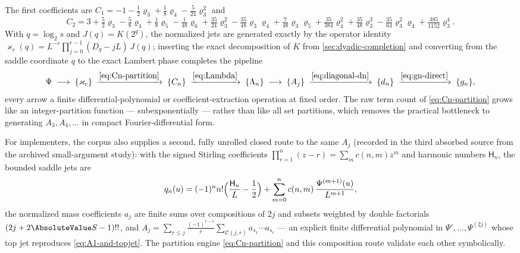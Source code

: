 \documentclass[11pt,oneside]{article}
\numberwithin{equation}{section}
\theoremstyle{definition}
\theoremstyle{remark}
\newcommand{\Hnum}{\mathsf H}
\begin{document}
The first coefficients are
$C_1=-1-\tfrac12\varrho_3+\tfrac18\varrho_4
-\tfrac5{24}\varrho_3^{2}$ and
\begin{equation}
 C_2=3+\tfrac52\varrho_3-\tfrac58\varrho_4+\tfrac18\varrho_5
 -\tfrac1{48}\varrho_6
 +\tfrac{35}{24}\varrho_3^{2}-\tfrac{35}{48}\varrho_3\varrho_4
 +\tfrac7{48}\varrho_3\varrho_5+\tfrac{35}{384}\varrho_4^{2}
 +\tfrac{35}{48}\varrho_3^{3}
 -\tfrac{35}{64}\varrho_3^{2}\varrho_4
 +\tfrac{385}{1152}\varrho_3^{4}.
 \label{eq:C2}
\end{equation}
With $q=\log_2s$ and $J(q)=K(2^{q})$, the normalized jets are
generated exactly by the operator identity
$\varkappa_r(q)=L^{-r}\prod_{j=0}^{r-1}(D_q-jL)\,J(q)$; inserting
the exact decomposition of $K$ from
\cref{sec:dyadic-completion} and converting from the saddle
coordinate $q$ to the exact Lambert phase completes the pipeline
\begin{equation}
 \Psi
 \;\longrightarrow\;\{\varkappa_r\}
 \;\xrightarrow{\eqref{eq:Cn-partition}}\;\{C_n\}
 \;\xrightarrow{\eqref{eq:Lambda}}\;\{\Lambda_n\}
 \;\longrightarrow\;\{A_j\}
 \;\xrightarrow{\eqref{eq:diagonal-dn}}\;\{d_n\}
 \;\xrightarrow{\eqref{eq:gn-direct}}\;\{g_n\},
 \label{eq:pipeline}
\end{equation}
every arrow a finite differential-polynomial or
coefficient-extraction operation at fixed order.  The raw term count
of \eqref{eq:Cn-partition} grows like an integer-partition function
--- subexponentially --- rather than like all set partitions, which
removes the practical bottleneck to generating $A_3,A_4,\dots$ in
compact Fourier-differential form.

For implementers, the corpus also supplies a second, fully unrolled
closed route to the same $A_j$ (recorded in the third absorbed
source from the archived small-argument study): with the signed
Stirling coefficients $\prod_{r=1}^{n}(z-r)=\sum_mc(n,m)z^{m}$ and
harmonic numbers $\Hnum_n$, the bounded saddle jets are
\begin{equation}
 q_n(u)=(-1)^{n}n!\Bigl(\frac{\Hnum_n}{L}-\frac12\Bigr)
 +\sum_{m=0}^{n}c(n,m)\,\frac{\Psi^{(m+1)}(u)}{L^{m+1}},
 \label{eq:qn-jets}
\end{equation}
the normalized mass coefficients $a_j$ are finite sums over
compositions of $2j$ and subsets weighted by double factorials
$(2j+2\AbsoluteValue S-1)!!$, and
$A_j=\sum_{r\le j}\frac{(-1)^{r-1}}r
\sum_{\mathcal C(j,r)}a_{s_1}\cdots a_{s_r}$ --- an explicit finite
differential polynomial in $\Psi',\dots,\Psi^{(2j)}$ whose top jet
reproduces \eqref{eq:A1-and-topjet}.  The partition engine
\eqref{eq:Cn-partition} and this composition route validate each
other symbolically.
\end{document}
